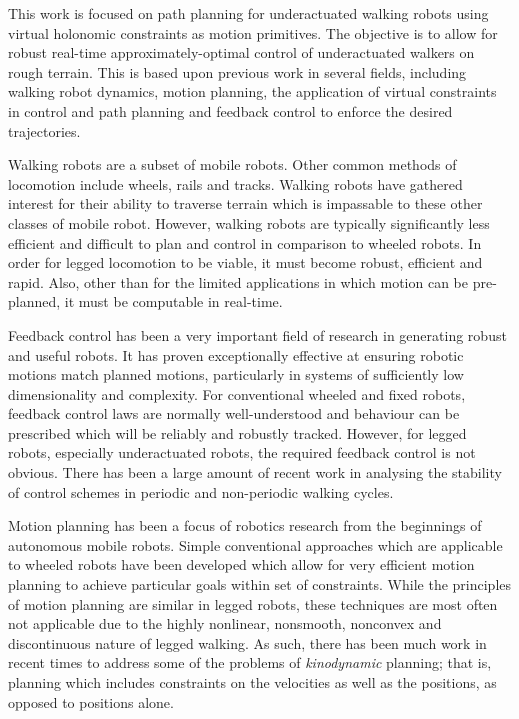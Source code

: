 This work is focused on path planning for underactuated walking robots using virtual holonomic constraints as motion primitives. The objective is to allow for robust real-time approximately-optimal control of underactuated walkers on rough terrain. This is based upon previous work in several fields, including walking robot dynamics, motion planning, the application of virtual constraints in control and path planning and feedback control to enforce the desired trajectories.

Walking robots are a subset of mobile robots. Other common methods of locomotion include wheels, rails and tracks. Walking robots have gathered interest for their ability to traverse terrain which is impassable to these other classes of mobile robot. However, walking robots are typically significantly less efficient and difficult to plan and control in comparison to wheeled robots. In order for legged locomotion to be viable, it must become robust, efficient and rapid. Also, other than for the limited applications in which motion can be pre-planned, it must be computable in real-time.

Feedback control has been a very important field of research in generating robust and useful robots. It has proven exceptionally effective at ensuring robotic motions match planned motions, particularly in systems of sufficiently low dimensionality and complexity. For conventional wheeled and fixed robots, feedback control laws are normally well-understood and behaviour can be prescribed which will be reliably and robustly tracked. However, for legged robots, especially underactuated robots, the required feedback control is not obvious. There has been a large amount of recent work in analysing the stability of control schemes in periodic and non-periodic walking cycles.

Motion planning has been a focus of robotics research from the beginnings of autonomous mobile robots. Simple conventional approaches which are applicable to wheeled robots have been developed which allow for very efficient motion planning to achieve particular goals within set of constraints. While the principles of motion planning are similar in legged robots, these techniques are most often not applicable due to the highly nonlinear, nonsmooth, nonconvex and discontinuous nature of legged walking. As such, there has been much work in recent times to address some of the problems of \textit{kinodynamic} planning; that is, planning which includes constraints on the velocities as well as the positions, as opposed to positions alone.

